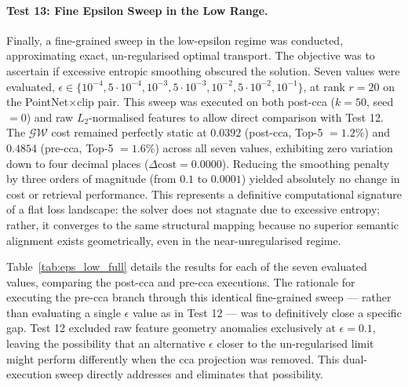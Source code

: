 \paragraph{Test 13: Fine Epsilon Sweep in the Low Range.}
Finally, a fine-grained sweep in the low-epsilon regime was conducted, approximating exact, un-regularised optimal transport. The objective was to ascertain if excessive entropic smoothing obscured the solution. Seven values were evaluated, $\epsilon \in \{10^{-4}, 5 \cdot 10^{-4}, 10^{-3}, 5 \cdot 10^{-3}, 10^{-2}, 5 \cdot 10^{-2}, 10^{-1}\}$, at rank $r=20$ on the PointNet$\times$\gls{clip} pair. This sweep was executed on both post-\gls{cca} ($k=50$, seed$=0$) and raw $L_2$-normalised features to allow direct comparison with Test 12. The $\mathcal{GW}$ cost remained perfectly static at $0.0392$ (post-\gls{cca}, Top-5 $=1.2\%$) and $0.4854$ (pre-\gls{cca}, Top-5 $=1.6\%$) across all seven values, exhibiting zero variation down to four decimal places ($\Delta\text{cost} = 0.0000$). Reducing the smoothing penalty by three orders of magnitude (from $0.1$ to $0.0001$) yielded absolutely no change in cost or retrieval performance. This represents a definitive computational signature of a flat loss landscape: the solver does not stagnate due to excessive entropy; rather, it converges to the same structural mapping because no superior semantic alignment exists geometrically, even in the near-unregularised regime.

Table~\ref{tab:eps_low_full} details the results for each of the seven evaluated values, comparing the post-\gls{cca} and pre-\gls{cca} executions. The rationale for executing the pre-\gls{cca} branch through this identical fine-grained sweep --- rather than evaluating a single $\epsilon$ value as in Test 12 --- was to definitively close a specific gap. Test 12 excluded raw feature geometry anomalies exclusively at $\epsilon = 0.1$, leaving the possibility that an alternative $\epsilon$ closer to the un-regularised limit might perform differently when the \gls{cca} projection was removed. This dual-execution sweep directly addresses and eliminates that possibility.

